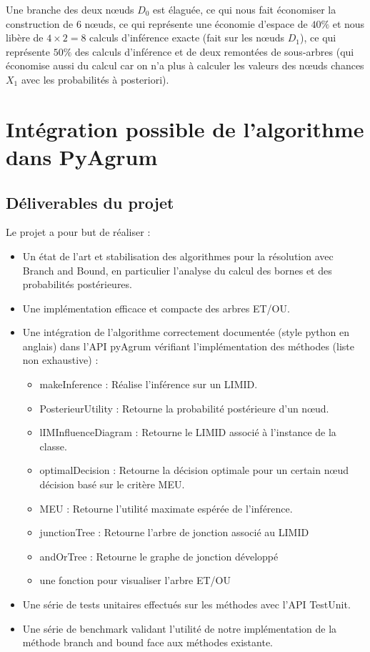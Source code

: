 \documentclass[12pt]{article}
\begin{document}
Une branche des deux nœuds $D_0$ est élaguée, ce qui nous fait économiser la construction de 6 nœuds, ce qui représente une économie d'espace de $40\%$ et nous libère de $4\times 2=8$ calculs d'inférence exacte (fait sur les nœuds $D_1$), ce qui représente $50\%$ des calculs d'inférence et de deux remontées de sous-arbres (qui économise aussi du calcul car on n'a plus à calculer les valeurs des nœuds chances $X_1$ avec les probabilités à posteriori).

\section{Intégration possible de l'algorithme dans PyAgrum}
\subsection{Déliverables du projet}
Le projet a pour but de réaliser :
\begin{itemize}
\item Un état de l'art et stabilisation des algorithmes pour la résolution avec Branch and Bound, en particulier l'analyse du calcul des bornes et des probabilités postérieures.
\item Une implémentation efficace et compacte des arbres ET/OU.

\item Une intégration de l'algorithme correctement documentée (style python en anglais) dans l'API pyAgrum vérifiant l'implémentation des méthodes (liste non exhaustive) :
\begin{itemize}
    \item makeInference : Réalise l'inférence sur un LIMID.
    \item PosterieurUtility : Retourne la probabilité postérieure d'un nœud.
    \item lIMInfluenceDiagram : Retourne le LIMID associé à l'instance de la classe.
    \item optimalDecision : Retourne la décision optimale pour un certain nœud décision basé sur le critère MEU.
    \item MEU : Retourne l'utilité maximate espérée de l'inférence.
    \item junctionTree : Retourne l'arbre de jonction associé au LIMID
    \item andOrTree : Retourne le graphe de jonction développé
    \item une fonction pour visualiser l'arbre ET/OU
\end{itemize}
\item Une série de tests unitaires effectués sur les méthodes avec l'API TestUnit.
\item Une série de benchmark validant l'utilité de notre implémentation de la méthode branch and bound face aux méthodes existante.
\end{itemize}
\end{document}

